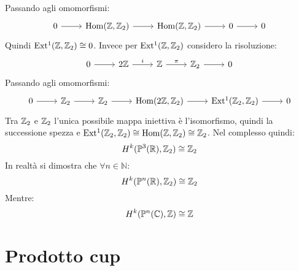 \begin{example}
\[  \]
  Passando agli omomorfismi:
  \[
    \begin{tikzcd}
      0 \rar & \hom{\Z, \Z_2} \rar & \hom{\Z, \Z_2} \rar & 0 \rar & 0
    \end{tikzcd}
  \]
  Quindi $ \mathrm{Ext^1}( \mathbb{Z}, \mathbb{Z}_2) \cong 0 $.
  Invece per $ \mathrm{Ext^1}( \mathbb{Z}, \mathbb{Z}_2) $ considero la risoluzione:
  \[
    \begin{tikzcd}
      0 \rar & 2 \Z \rar{i} & \Z \rar{\pi} & \Z_2 \rar & 0
    \end{tikzcd}
  \]
  Passando agli omomorfismi:
  \[
    \begin{tikzcd}
      0 \rar & \Z_2 \rar & \Z_2 \rar & \hom{2\Z, \Z_2} \rar & \ext{\Z_2, \Z_2} \rar & 0
    \end{tikzcd}
  \]
  Tra $ \mathbb{Z}_2 $ e $ \mathbb{Z}_2 $ l'unica possibile mappa iniettiva è l'isomorfismo, quindi
  la successione spezza e $ \mathrm{Ext^1}( \mathbb{Z}_2, \mathbb{Z}_2) \cong \mathrm{Hom}( \mathbb{Z}, \mathbb{Z}_2) \cong \mathbb{Z}_2 $.
  Nel complesso quindi:
  \[
    H^k(\mathbb{P}^3 (\mathbb{R}), \mathbb{Z}_2) \cong \mathbb{Z}_2
  \]
  In realtà si dimostra che $ \forall n \in \mathbb{N} $:
  \[
    H^k(\mathbb{P}^n (\mathbb{R}), \mathbb{Z}_2) \cong \mathbb{Z}_2
  \]
  Mentre:
  \[
    H^k(\mathbb{P}^n (\mathbb{C}), \mathbb{Z}) \cong \mathbb{Z}
  \]
\end{example}


\section{Prodotto cup}

